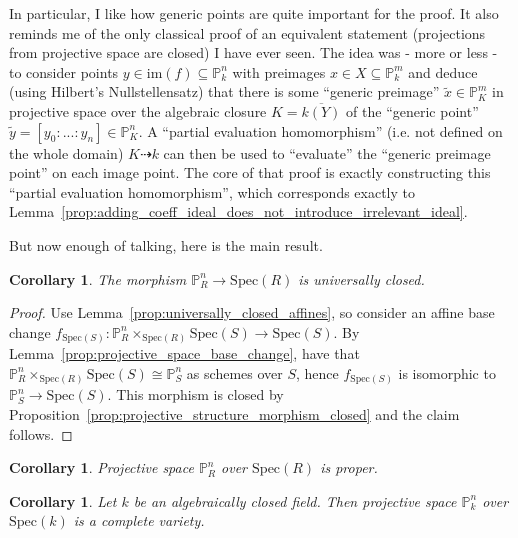 \documentclass{scrartcl}
\renewcommand{\P}{\mathbb{P}}
\newcommand{\Spec}{\mathrm{Spec}}
\newcommand{\im}{\mathrm{im}}
\newtheorem{corollary}[subsection]{Corollary}
\theoremstyle{definition}
\begin{document}
In particular, I like how generic points are quite important for the proof.
It also reminds me of the only classical proof of an equivalent statement (projections from projective space are closed) I have ever seen.
The idea was - more or less - to consider points $y \in \im(f) \subseteq \P_k^n$ with preimages $x \in X \subseteq \P_k^m$ and deduce (using Hilbert's Nullstellensatz) that there is some ``generic preimage'' $\tilde{x} \in \P_K^m$ in projective space over the algebraic closure $K = \overline{k(Y)}$ of the ``generic point'' $\tilde{y} = [y_0 : ... : y_n] \in \P_K^n$.
A ``partial evaluation homomorphism'' (i.e. not defined on the whole domain) $K \dashrightarrow k$ can then be used to ``evaluate'' the ``generic preimage point'' on each image point.
The core of that proof is exactly constructing this ``partial evaluation homomorphism'', which corresponds exactly to Lemma~\ref{prop:adding_coeff_ideal_does_not_introduce_irrelevant_ideal}.

But now enough of talking, here is the main result.
\begin{corollary}
    The morphism $\P_R^n \to \Spec(R)$ is universally closed.
\end{corollary}
\begin{proof}
    Use Lemma~\ref{prop:universally_closed_affines}, so consider an affine base change $f_{\Spec(S)}: \P_R^n \times_{\Spec(R)} \Spec(S) \to \Spec(S)$.
    By Lemma~\ref{prop:projective_space_base_change}, have that $\P_R^n \times_{\Spec(R)} \Spec(S) \cong \P_S^n$ as schemes over $S$, hence $f_{\Spec(S)}$ is isomorphic to $\P_S^n \to \Spec(S)$.
    This morphism is closed by Proposition~\ref{prop:projective_structure_morphism_closed} and the claim follows.
\end{proof}
\begin{corollary}
    Projective space $\P_R^n$ over $\Spec(R)$ is proper.
\end{corollary}
\begin{corollary}
    Let $k$ be an algebraically closed field.
    Then projective space $\P_k^n$ over $\Spec(k)$ is a complete variety.
\end{corollary}
\end{document}
